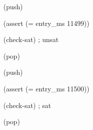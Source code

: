 \documentclass[11pt,a4paper]{article}
\begin{document}
\begin{minipage}{\linewidth}
{\begin{minipage}{\dimexpr\linewidth-2\fboxsep-2\fboxrule\relax}
\noindent{}\hspace{.8em}\parbox[t]{\dimexpr\linewidth-2.8em\relax}{\raggedright\ttfamily\fontsize{8.2}{10.5}\selectfont \hspace*{0.0em}(push)\strut}\par\vspace{1pt}
\noindent{}\hspace{.8em}\parbox[t]{\dimexpr\linewidth-2.8em\relax}{\raggedright\ttfamily\fontsize{8.2}{10.5}\selectfont \hspace*{0.0em}(assert (= entry\_ms 11499))\strut}\par\vspace{1pt}
\noindent{}\hspace{.8em}\parbox[t]{\dimexpr\linewidth-2.8em\relax}{\raggedright\ttfamily\fontsize{8.2}{10.5}\selectfont \hspace*{0.0em}(check-sat) ; unsat\strut}\par\vspace{1pt}
\noindent{}\hspace{.8em}\parbox[t]{\dimexpr\linewidth-2.8em\relax}{\raggedright\ttfamily\fontsize{8.2}{10.5}\selectfont \hspace*{0.0em}(pop)\strut}\par\vspace{1pt}
\noindent{}\hspace{.8em}\parbox[t]{\dimexpr\linewidth-2.8em\relax}{\raggedright\ttfamily\fontsize{8.2}{10.5}\selectfont \hspace*{0.0em}(push)\strut}\par\vspace{1pt}
\noindent{}\hspace{.8em}\parbox[t]{\dimexpr\linewidth-2.8em\relax}{\raggedright\ttfamily\fontsize{8.2}{10.5}\selectfont \hspace*{0.0em}(assert (= entry\_ms 11500))\strut}\par\vspace{1pt}
\noindent{}\hspace{.8em}\parbox[t]{\dimexpr\linewidth-2.8em\relax}{\raggedright\ttfamily\fontsize{8.2}{10.5}\selectfont \hspace*{0.0em}(check-sat) ; sat\strut}\par\vspace{1pt}
\noindent{}\hspace{.8em}\parbox[t]{\dimexpr\linewidth-2.8em\relax}{\raggedright\ttfamily\fontsize{8.2}{10.5}\selectfont \hspace*{0.0em}(pop)\strut}\par\vspace{1pt}
\end{minipage}}\par\medskip
\end{minipage}\par\medskip
\end{document}
